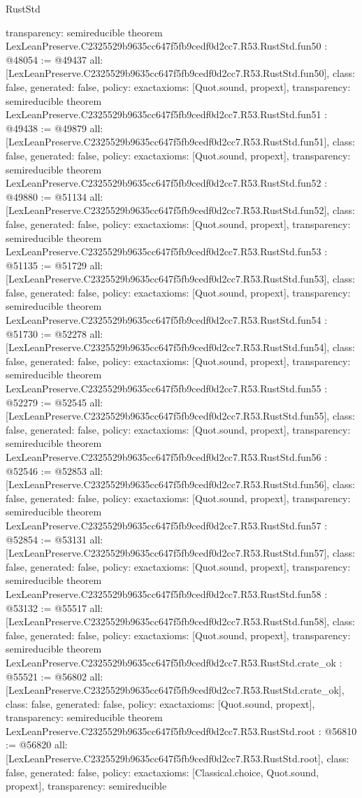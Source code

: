 \begin{lexlean}{RustStd}
\begin{coremodule}
{  transparency: semireducible
}
theorem LexLeanPreserve.C2325529b9635cc647f5fb9cedf0d2cc7.R53.RustStd.fun50 : @48054 := @49437 {
  all: [LexLeanPreserve.C2325529b9635cc647f5fb9cedf0d2cc7.R53.RustStd.fun50],
  class: false,
  generated: false,
  policy: exact{axioms: [Quot.sound, propext]},
  transparency: semireducible
}
theorem LexLeanPreserve.C2325529b9635cc647f5fb9cedf0d2cc7.R53.RustStd.fun51 : @49438 := @49879 {
  all: [LexLeanPreserve.C2325529b9635cc647f5fb9cedf0d2cc7.R53.RustStd.fun51],
  class: false,
  generated: false,
  policy: exact{axioms: [Quot.sound, propext]},
  transparency: semireducible
}
theorem LexLeanPreserve.C2325529b9635cc647f5fb9cedf0d2cc7.R53.RustStd.fun52 : @49880 := @51134 {
  all: [LexLeanPreserve.C2325529b9635cc647f5fb9cedf0d2cc7.R53.RustStd.fun52],
  class: false,
  generated: false,
  policy: exact{axioms: [Quot.sound, propext]},
  transparency: semireducible
}
theorem LexLeanPreserve.C2325529b9635cc647f5fb9cedf0d2cc7.R53.RustStd.fun53 : @51135 := @51729 {
  all: [LexLeanPreserve.C2325529b9635cc647f5fb9cedf0d2cc7.R53.RustStd.fun53],
  class: false,
  generated: false,
  policy: exact{axioms: [Quot.sound, propext]},
  transparency: semireducible
}
theorem LexLeanPreserve.C2325529b9635cc647f5fb9cedf0d2cc7.R53.RustStd.fun54 : @51730 := @52278 {
  all: [LexLeanPreserve.C2325529b9635cc647f5fb9cedf0d2cc7.R53.RustStd.fun54],
  class: false,
  generated: false,
  policy: exact{axioms: [Quot.sound, propext]},
  transparency: semireducible
}
theorem LexLeanPreserve.C2325529b9635cc647f5fb9cedf0d2cc7.R53.RustStd.fun55 : @52279 := @52545 {
  all: [LexLeanPreserve.C2325529b9635cc647f5fb9cedf0d2cc7.R53.RustStd.fun55],
  class: false,
  generated: false,
  policy: exact{axioms: [Quot.sound, propext]},
  transparency: semireducible
}
theorem LexLeanPreserve.C2325529b9635cc647f5fb9cedf0d2cc7.R53.RustStd.fun56 : @52546 := @52853 {
  all: [LexLeanPreserve.C2325529b9635cc647f5fb9cedf0d2cc7.R53.RustStd.fun56],
  class: false,
  generated: false,
  policy: exact{axioms: [Quot.sound, propext]},
  transparency: semireducible
}
theorem LexLeanPreserve.C2325529b9635cc647f5fb9cedf0d2cc7.R53.RustStd.fun57 : @52854 := @53131 {
  all: [LexLeanPreserve.C2325529b9635cc647f5fb9cedf0d2cc7.R53.RustStd.fun57],
  class: false,
  generated: false,
  policy: exact{axioms: [Quot.sound, propext]},
  transparency: semireducible
}
theorem LexLeanPreserve.C2325529b9635cc647f5fb9cedf0d2cc7.R53.RustStd.fun58 : @53132 := @55517 {
  all: [LexLeanPreserve.C2325529b9635cc647f5fb9cedf0d2cc7.R53.RustStd.fun58],
  class: false,
  generated: false,
  policy: exact{axioms: [Quot.sound, propext]},
  transparency: semireducible
}
theorem LexLeanPreserve.C2325529b9635cc647f5fb9cedf0d2cc7.R53.RustStd.crate_ok : @55521 := @56802 {
  all: [LexLeanPreserve.C2325529b9635cc647f5fb9cedf0d2cc7.R53.RustStd.crate_ok],
  class: false,
  generated: false,
  policy: exact{axioms: [Quot.sound, propext]},
  transparency: semireducible
}
theorem LexLeanPreserve.C2325529b9635cc647f5fb9cedf0d2cc7.R53.RustStd.root : @56810 := @56820 {
  all: [LexLeanPreserve.C2325529b9635cc647f5fb9cedf0d2cc7.R53.RustStd.root],
  class: false,
  generated: false,
  policy: exact{axioms: [Classical.choice, Quot.sound, propext]},
  transparency: semireducible
}


\end{coremodule}
\end{lexlean}
